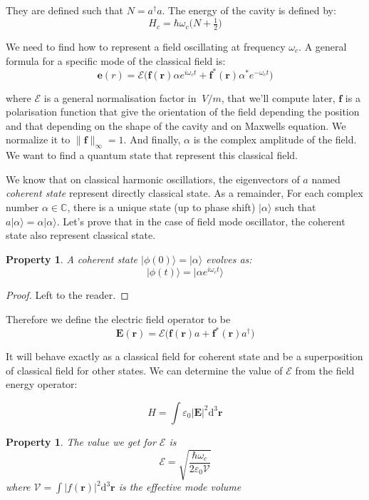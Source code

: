 \documentclass[10pt,a4paper]{report}
\theoremstyle{plain}
\newtheorem{prop}[thm]{Property}
\theoremstyle{definition}
\theoremstyle{remark}
\newcommand{\C}{\ensuremath{\mathbb{C}}}
\newcommand{\TODO}{\textbf{TODO}}
\newcommand{\ket}[1]{|#1\rangle}
\newcommand{\dd}{\mathrm{d}}
\newcommand{\bs}{\boldsymbol}
\begin{document}
They are defined such that $N = a^\dagger a$. The energy of the cavity is
defined by:
\[H_c = \hbar \omega_c \big(N + \tfrac 12\big)\]

We need to find how to represent a field oscillating at frequency $\omega_c$.
A general formula for a specific mode of the classical field is:
\[\bs e(r) = \mathcal{E}\big(\bs f(\bs r) \alpha e^{i\omega_c t} + \bs f^*(\bs r)
  \alpha^* e^{-\omega_c t}\big)\]

where $\mathcal{E}$ is a general normalisation factor in $\SI{}{V/m}$, that
we'll compute later, $\bs f$
is a polarisation function that give the orientation of the field depending the
position and that depending on the shape of the cavity and on Maxwells equation.
We normalize it to $\|\bs f\|_\infty = 1$. And finally, $\alpha$ is the complex amplitude
of the field. We want to find a quantum state that represent this classical
field.

We know that on classical harmonic oscillatiors, the eigenvectors of $a$ named
\emph{coherent state} represent directly classical state. As a remainder, For
each complex number $\alpha \in \C$, there is a unique state (up to phase shift)
$\ket \alpha$ such that $a \ket \alpha = \alpha \ket \alpha$.
Let's prove that in the case of field mode oscillator, the coherent state also
represent classical state.

\begin{prop}
  A coherent state $\ket{\phi(0)} = \ket \alpha$ evolves as:
  \[ \ket {\phi(t)} = \ket {\alpha e^{i\omega_c t}} \]
\end{prop}

\begin{proof}Left to the reader.
\end{proof}

Therefore we define the electric field operator to be
\begin{equation}\label{eqn:Eop}
\bs E(\bs r) = \mathcal{E}\big(\bs f(\bs r) a + \bs f^*(\bs r)
  a^\dagger \big)
\end{equation}

It will behave exactly as a classical field for coherent state and be a
superposition of classical field for other states. We can determine the value of
$\mathcal{E}$ from the field energy operator:

\[ H = \int \varepsilon_0 |{\bs E}|^2 \dd^3 \bs r \]

\begin{prop}
  The value we get for $\mathcal{E}$ is
\[ \mathcal{E} = \sqrt{\frac{\hbar \omega_c}{2 \varepsilon_0 \mathcal{V}}}\]
where $\mathcal{V} = \int \bs |f(\bs r)|^2\dd^3\bs r$ is the effective mode volume
\end{prop}
\end{document}
